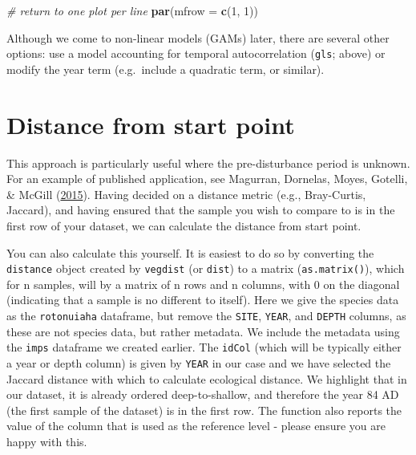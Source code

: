 \documentclass[nofonts,]{tufte-handout}
\newenvironment{Shaded}{\begin{snugshade}}{\end{snugshade}}
\newcommand{\AttributeTok}[1]{\textcolor[rgb]{0.13,0.29,0.53}{#1}}
\newcommand{\CommentTok}[1]{\textcolor[rgb]{0.56,0.35,0.01}{\textit{#1}}}
\newcommand{\DecValTok}[1]{\textcolor[rgb]{0.00,0.00,0.81}{#1}}
\newcommand{\FunctionTok}[1]{\textcolor[rgb]{0.13,0.29,0.53}{\textbf{#1}}}
\newcommand{\NormalTok}[1]{#1}
\begin{document}
\begin{Shaded}
\begin{Highlighting}[]
\CommentTok{\# return to one plot per line}
\FunctionTok{par}\NormalTok{(}\AttributeTok{mfrow =} \FunctionTok{c}\NormalTok{(}\DecValTok{1}\NormalTok{, }\DecValTok{1}\NormalTok{))}
\end{Highlighting}
\end{Shaded}

Although we come to non-linear models (GAMs) later, there are several
other options: use a model accounting for temporal autocorrelation
(\texttt{gls}; above) or modify the year term (e.g.~include a quadratic
term, or similar).

\hypertarget{distance-from-start-point}{%
\section{Distance from start point}\label{distance-from-start-point}}

This approach is particularly useful where the pre-disturbance period is
unknown. For an example of published application, see Magurran,
Dornelas, Moyes, Gotelli, \& McGill
(\protect\hyperlink{ref-magurran_15_rapid}{2015}). Having decided on a
distance metric (e.g., Bray-Curtis, Jaccard), and having ensured that
the sample you wish to compare to is in the first row of your dataset,
we can calculate the distance from start point.

You can also calculate this yourself. It is easiest to do so by
converting the \texttt{distance} object created by \texttt{vegdist} (or
\texttt{dist}) to a matrix (\texttt{as.matrix()}), which for n samples,
will by a matrix of n rows and n columns, with 0 on the diagonal
(indicating that a sample is no different to itself). Here we give the
species data as the \texttt{rotonuiaha} dataframe, but remove the
\texttt{SITE}, \texttt{YEAR}, and \texttt{DEPTH} columns, as these are
not species data, but rather metadata. We include the metadata using the
\texttt{imps} dataframe we created earlier. The \texttt{idCol} (which
will be typically either a year or depth column) is given by
\texttt{YEAR} in our case and we have selected the Jaccard distance with
which to calculate ecological distance. We highlight that in our
dataset, it is already ordered deep-to-shallow, and therefore the year
84 AD (the first sample of the dataset) is in the first row. The
function also reports the value of the column that is used as the
reference level - please ensure you are happy with this.
\end{document}

